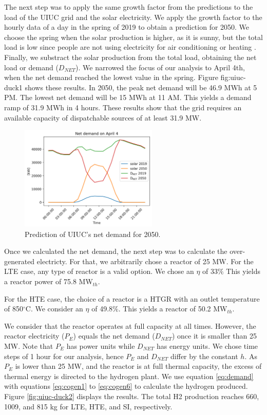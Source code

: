 \documentclass[11pt,letterpaper]{article}
\begin{document}
The next step was to apply the same growth factor from the predictions to the load of the \gls{UIUC} grid and the solar electricity.
We apply the growth factor to the hourly data of a day in the spring of 2019 to obtain a prediction for 2050.
We choose the spring when the solar production is higher, as it is sunny, but the total load is low since people are not using electricity for air conditioning or heating \cite{us_department_of_energy_confronting_2017}.
Finally, we substract the solar production from the total load, obtaining the net load or demand ($D_{NET}$).
We narrowed the focus of our analysis to April 4th, when the net demand reached the lowest value in the spring.
Figure {fig:uiuc-duck1} shows these results.
In 2050, the peak net demand will be 46.9 MWh at 5 PM.
The lowest net demand will be 15 MWh at 11 AM.
This yields a demand ramp of 31.9 MWh in 4 hours.
These results show that the grid requires an available capacity of dispatchable sources of at least 31.9 MW.

\begin{figure}[htbp!]
		\centering
	\includegraphics[height=5cm]{figures/uiuc-duck}
	\hfill
	\caption{Prediction of \gls{UIUC}'s net demand for 2050.}
	\label{fig:uiuc-duck1}
\end{figure}

Once we calculated the net demand, the next step was to calculate the over-generated electricty.
For that, we arbitrarily chose a reactor of 25 MW.
For the \gls{LTE} case, any type of reactor is a valid option.
We chose an $\eta$ of 33$\%$
This yields a reactor power of 75.8 MW$_{th}$.

For the \gls{HTE} case, the choice of a reactor is a \gls{HTGR} with an outlet temperature of 850$^{\circ}$C.
We consider an $\eta$ of 49.8$\%$.
This yields a reactor of 50.2 MW$_{th}$.

We consider that the reactor operates at full capacity at all times.
However, the reactor electricity ($P_{E}$) equals the net demand ($D_{NET}$) once it is smaller than 25 MW.
Note that $P_{E}$ has power units while $D_{NET}$ has energy units.
We chose time steps of 1 hour for our analysis, hence $P_{E}$ and $D_{NET}$ differ by the constant $h$.
As $P_{E}$ is lower than 25 MW, and the reactor is at full thermal capacity, the excess of thermal energy is directed to the hydrogen plant.
We use equation \ref{eq:demand} with equations \ref{eq:cogen1} to \ref{eq:cogen6} to calculate the hydrogen produced.
Figure \ref{fig:uiuc-duck2} displays the results.
The total \gls{H2} production reaches 660, 1009, and 815 kg for \gls{LTE}, \gls{HTE}, and \gls{SI}, respectively.
\end{document}
